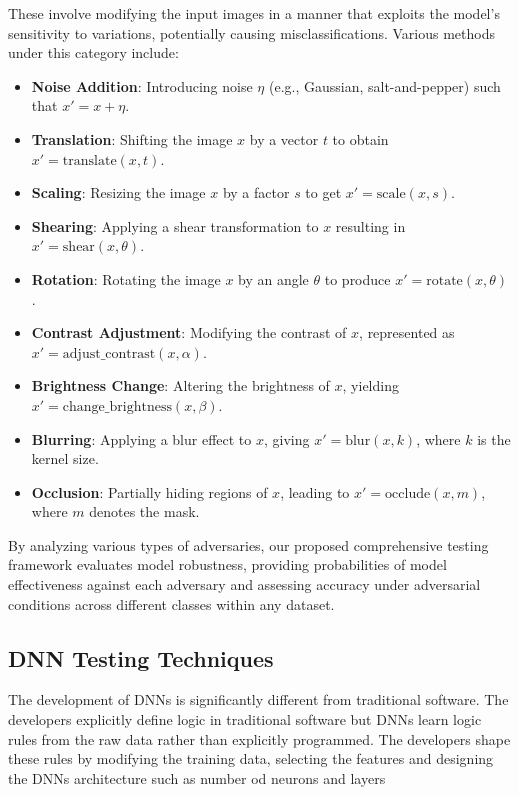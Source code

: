 \documentclass[10pt, conference, a4paper, final]{IEEEtran}
\begin{document}
These involve modifying the input images in a manner that exploits the model's sensitivity to variations, potentially causing misclassifications. Various methods under this category include:
\begin{itemize}
    \item \textbf{Noise Addition}: Introducing noise \( \eta \) (e.g., Gaussian, salt-and-pepper) such that \( x' = x + \eta \).
    \item \textbf{Translation}: Shifting the image \( x \) by a vector \( t \) to obtain \( x' = \text{translate}(x, t) \).
    \item \textbf{Scaling}: Resizing the image \( x \) by a factor \( s \) to get \( x' = \text{scale}(x, s) \).
    \item \textbf{Shearing}: Applying a shear transformation to \( x \) resulting in \( x' = \text{shear}(x, \theta) \).
    \item \textbf{Rotation}: Rotating the image \( x \) by an angle \( \theta \) to produce \( x' = \text{rotate}(x, \theta) \).
    \item \textbf{Contrast Adjustment}: Modifying the contrast of \( x \), represented as \( x' = \text{adjust\_contrast}(x, \alpha) \).
    \item \textbf{Brightness Change}: Altering the brightness of \( x \), yielding \( x' = \text{change\_brightness}(x, \beta) \).
    \item \textbf{Blurring}: Applying a blur effect to \( x \), giving \( x' = \text{blur}(x, k) \), where \( k \) is the kernel size.
    \item \textbf{Occlusion}: Partially hiding regions of \( x \), leading to \( x' = \text{occlude}(x, m) \), where \( m \) denotes the mask.
\end{itemize}

By analyzing various types of adversaries, our proposed comprehensive testing framework evaluates model robustness, providing probabilities of model effectiveness against each adversary and assessing accuracy under adversarial conditions across different classes within any dataset.


\subsection {DNN Testing Techniques}
The development of DNNs is significantly different from traditional software. The developers explicitly define logic in traditional software but DNNs learn logic rules from the raw data rather than explicitly programmed. The developers shape these rules by modifying the training data, selecting the features and designing the DNNs architecture such as number od neurons and layers 
\end{document}
